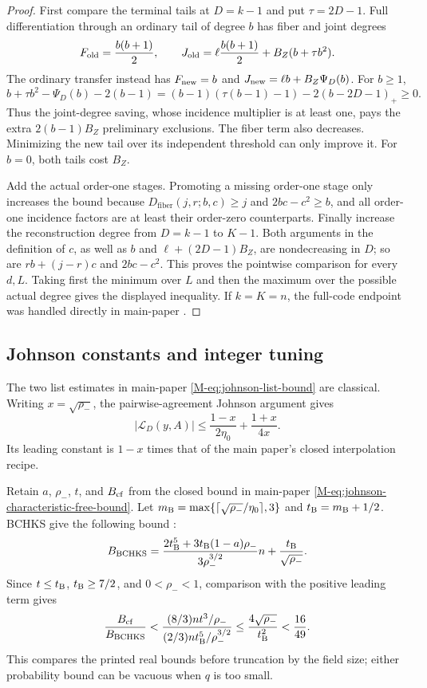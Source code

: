 \documentclass[11pt,letterpaper]{article}
\theoremstyle{definition}
\newcommand{\List}{\mathcal{L}}
\newcommand{\BZ}{B_Z}
\newcommand{\gJohnson}{\eta_0}
\begin{document}
\begin{proof}
First compare the terminal tails at $D=k-1$ and put $\tau=2D-1$.
Full differentiation through an ordinary tail of degree $b$ has fiber
and joint degrees
\[
 F_{\rm old}=\frac{b(b+1)}2,\qquad
 J_{\rm old}=\ell\frac{b(b+1)}2+\BZ(b+\tau b^2).
\]
The ordinary transfer instead has $F_{\rm new}=b$ and
$J_{\rm new}=\ell b+\BZ\Psi_D(b)$. For $b\ge1$,
\[
 b+\tau b^2-\Psi_D(b)-2(b-1)
 =(b-1)(\tau(b-1)-1)-2(b-2D-1)_+\ge0.
\]
Thus the joint-degree saving, whose incidence multiplier is at least one,
pays the extra $2(b-1)\BZ$ preliminary exclusions. The fiber term also
decreases. Minimizing the new tail over its independent threshold can only
improve it. For $b=0$, both tails cost $\BZ$.

Add the actual order-one stages. Promoting a missing order-one stage only
increases the bound because $D_{\mathrm{fiber}}(j,r;b,c)\ge j$ and
$2bc-c^2\ge b$, and all order-one incidence factors are at least their
order-zero counterparts. Finally increase the reconstruction degree from
$D=k-1$ to $K-1$. Both arguments in the definition of $c$, as well as $b$
and $\ell+(2D-1)\BZ$, are nondecreasing in $D$; so are $rb+(j-r)c$ and
$2bc-c^2$. This proves the pointwise comparison for every $d,L$. Taking
first the minimum over $L$ and then the maximum over the possible actual
degree gives the displayed inequality. If $k=K=n$, the full-code endpoint
was handled directly in main-paper .
\end{proof}

\subsection{Johnson constants and integer tuning}

The two list estimates in main-paper \eqref{M-eq:johnson-list-bound} are
classical. Writing $x=\sqrt{\rho_-}$, the pairwise-agreement Johnson
argument gives
\[
 |\List_D(y,A)|\le\frac{1-x}{2\gJohnson}+\frac{1+x}{4x}.
\]
Its leading constant is $1-x$ times that of the main paper's closed
interpolation recipe.

Retain $a$, $\rho_-$, $t$, and $B_{\rm cf}$ from the closed bound in
main-paper \eqref{M-eq:johnson-characteristic-free-bound}. Let
$m_{\rm B}=\max\{\lceil\sqrt{\rho_-}/\gJohnson\rceil,3\}$ and
$t_{\rm B}=m_{\rm B}+1/2$. BCHKS give the following bound
\cite[full version, Theorem~4.6]{BCHKS25}:
\[
 B_{\rm BCHKS}
 =\frac{2t_{\rm B}^5+3t_{\rm B}(1-a)\rho_-}
        {3\rho_-^{3/2}}n
  +\frac{t_{\rm B}}{\sqrt{\rho_-}}.
\]
Since $t\le t_{\rm B}$, $t_{\rm B}\ge7/2$, and $0<\rho_-<1$, comparison
with the positive leading term gives
\[
 \frac{B_{\rm cf}}{B_{\rm BCHKS}}
 <\frac{(8/3)nt^3/\rho_-}{(2/3)nt_{\rm B}^5/\rho_-^{3/2}}
 \le\frac{4\sqrt{\rho_-}}{t_{\rm B}^2}<\frac{16}{49}.
\]
This compares the printed real bounds before truncation by the field size;
either probability bound can be vacuous when $q$ is too small.
\end{document}
